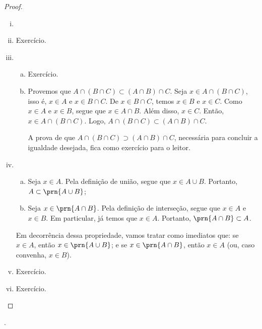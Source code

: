 \begin{proof}
\begin{enumerate}[i)]
\item[]
\item Exercício.
\item
	\begin{enumerate}[a)]
		\item 
		Exercício.

		\item
		Provemos que $A \cap (B \cap C) \subset (A \cap B) \cap C$. 
		Seja $x \in A \cap (B \cap C)$, isso é, $x \in A$ e $x \in B \cap C$.
		De $x \in B \cap C$, temos $x \in B$ e $x \in C$.
		Como $x \in A$ e $x \in B$, segue que $x \in A \cap B$.
		Além disso, $x \in C$.
		Então, $x \in A \cap (B \cap C)$.
		Logo, $A \cap (B \cap C) \subset (A \cap B) \cap C$. 

		A prova de que $A \cap (B \cap C) \supset (A \cap B) \cap C$, necessária para concluir a igualdade desejada, fica como exercício para o leitor.

	\end{enumerate}

\item 	
	\begin{enumerate}[a)]
		\item Seja $x \in A$. Pela definição de união, segue que $x \in A \cup B$. Portanto, $A \subset \prn{A \cup B}$;
		\item Seja $x \in \prn{A \cap B}$. Pela definição de interseção, segue que $x\in A$ e $x \in B$. 
		Em particular, já temos que $x \in A$. Portanto, $\prn{A \cap B} \subset A$.
	\end{enumerate}
	Em decorrência dessa propriedade, vamos tratar como imediatos que: 
	se $x \in A$, então $x \in \prn{A \cup B}$; 
	e se $x \in \prn{A \cap B}$, então $x\in A$ (ou, caso convenha, $x\in B$).
\item Exercício.
\item Exercício.
\end{enumerate}
\end{proof}

\begin{onlineact}
.
\end{onlineact}


